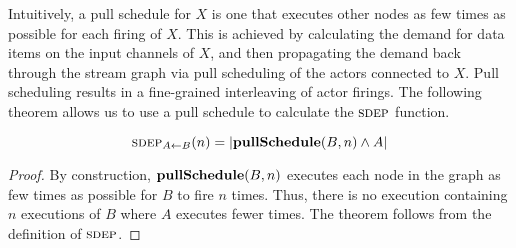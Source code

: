 \begin{center}
\end{center}
Intuitively, a pull schedule for $X$ is one that executes other nodes
as few times as possible for each firing of $X$.  This is achieved by
calculating the demand for data items on the input channels of $X$,
and then propagating the demand back through the stream graph via pull
scheduling of the actors connected to $X$.  Pull scheduling results in
a fine-grained interleaving of actor firings.  The following theorem
allows us to use a pull schedule to calculate the $\textsc{sdep}$ function.
\begin{theorem} 
\[
\sdepf{A}{B}(n) = |{\bf pullSchedule}(B, n) \wedge A|
\]
\end{theorem}
\begin{proof}
By construction, ${\bf pullSchedule}(B, n)$ executes each node in the
graph as few times as possible for $B$ to fire $n$ times.  Thus, there
is no execution containing $n$ executions of $B$ where $A$ executes
fewer times.  The theorem follows from the definition of $\textsc{sdep}$.
\end{proof}

